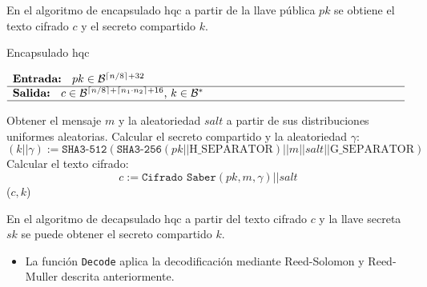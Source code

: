 En el algoritmo de encapsulado \acrshort{hqc} a partir de la llave pública \(pk\) se obtiene el texto cifrado \(c\) y el secreto compartido \(k\). 
\begin{algorithm}[H]
	\small 
	\caption{Encapsulado \acrshort{hqc}}
	$\begin{array}{p{\textwidth}}
		\textbf{Entrada: } \(pk\in \mathcal{B}^{\lceil n/8 \rceil+32}\)\\ 
		\hline
		\textbf{Salida: } \(c\in \mathcal{B}^{\lceil n/8 \rceil+\lceil n_1\cdot n_2 \rceil+16}\), \(k\in \mathcal{B}^{*}\)\\ 
		\hline
	\end{array}$
	\begin{algorithmic}[1]
		\State Obtener el mensaje \(m\) y la aleatoriedad \(salt\) a partir de sus distribuciones uniformes aleatorias.
		\State Calcular el secreto compartido y la aleatoriedad $\gamma$:
		\begin{equation}
			(k||\gamma):=\texttt{SHA3-512}(\texttt{SHA3-256}(pk||\text{H\_SEPARATOR})||m||salt||{\text{G\_SEPARATOR}})
		\end{equation}
		\State Calcular el texto cifrado:
		\begin{equation}
			c:=\texttt{Cifrado Saber}(pk,m,\gamma)|| salt
		\end{equation}
		\State \Return (\(c,k\))
	\end{algorithmic}
\end{algorithm}
\newpage
En el algoritmo de decapsulado \acrshort{hqc} a partir del texto cifrado \(c\) y la llave secreta \(sk\) se puede obtener el secreto compartido \(k\).
\begin{itemize}
	\item La función \texttt{Decode} aplica la decodificación mediante Reed-Solomon y Reed-Muller descrita anteriormente.
\end{itemize}
